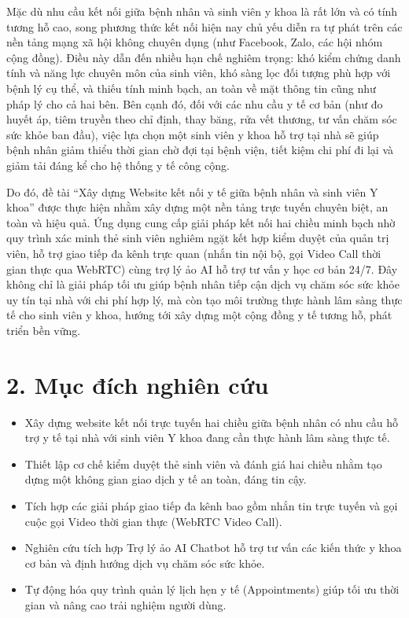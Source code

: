 \documentclass[a4paper,13pt]{extreport}
\begin{document}
Mặc dù nhu cầu kết nối giữa bệnh nhân và sinh viên y khoa là rất lớn và có tính tương hỗ cao, song phương thức kết nối hiện nay chủ yếu diễn ra tự phát trên các nền tảng mạng xã hội không chuyên dụng (như Facebook, Zalo, các hội nhóm cộng đồng). Điều này dẫn đến nhiều hạn chế nghiêm trọng: khó kiểm chứng danh tính và năng lực chuyên môn của sinh viên, khó sàng lọc đối tượng phù hợp với bệnh lý cụ thể, và thiếu tính minh bạch, an toàn về mặt thông tin cũng như pháp lý cho cả hai bên. Bên cạnh đó, đối với các nhu cầu y tế cơ bản (như đo huyết áp, tiêm truyền theo chỉ định, thay băng, rửa vết thương, tư vấn chăm sóc sức khỏe ban đầu), việc lựa chọn một sinh viên y khoa hỗ trợ tại nhà sẽ giúp bệnh nhân giảm thiểu thời gian chờ đợi tại bệnh viện, tiết kiệm chi phí đi lại và giảm tải đáng kể cho hệ thống y tế công cộng.

Do đó, đề tài ``Xây dựng Website kết nối y tế giữa bệnh nhân và sinh viên Y khoa'' được thực hiện nhằm xây dựng một nền tảng trực tuyến chuyên biệt, an toàn và hiệu quả. Ứng dụng cung cấp giải pháp kết nối hai chiều minh bạch nhờ quy trình xác minh thẻ sinh viên nghiêm ngặt kết hợp kiểm duyệt của quản trị viên, hỗ trợ giao tiếp đa kênh trực quan (nhắn tin nội bộ, gọi Video Call thời gian thực qua WebRTC) cùng trợ lý ảo AI hỗ trợ tư vấn y học cơ bản 24/7. Đây không chỉ là giải pháp tối ưu giúp bệnh nhân tiếp cận dịch vụ chăm sóc sức khỏe uy tín tại nhà với chi phí hợp lý, mà còn tạo môi trường thực hành lâm sàng thực tế cho sinh viên y khoa, hướng tới xây dựng một cộng đồng y tế tương hỗ, phát triển bền vững.

\section*{2. Mục đích nghiên cứu}

\begin{itemize}
    \item Xây dựng website kết nối trực tuyến hai chiều giữa bệnh nhân có nhu cầu hỗ trợ y tế tại nhà với sinh viên Y khoa đang cần thực hành lâm sàng thực tế.
    \item Thiết lập cơ chế kiểm duyệt thẻ sinh viên và đánh giá hai chiều nhằm tạo dựng một không gian giao dịch y tế an toàn, đáng tin cậy.
    \item Tích hợp các giải pháp giao tiếp đa kênh bao gồm nhắn tin trực tuyến và gọi cuộc gọi Video thời gian thực (WebRTC Video Call).
    \item Nghiên cứu tích hợp Trợ lý ảo AI Chatbot hỗ trợ tư vấn các kiến thức y khoa cơ bản và định hướng dịch vụ chăm sóc sức khỏe.
    \item Tự động hóa quy trình quản lý lịch hẹn y tế (Appointments) giúp tối ưu thời gian và nâng cao trải nghiệm người dùng.
\end{itemize}
\end{document}

